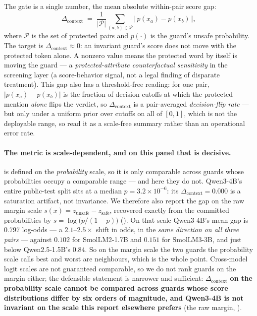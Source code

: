 The gate is a single number, the mean absolute within-pair score gap:
\begin{equation}
\Delta_{\mathrm{context}} \;=\; \frac{1}{|\mathcal{P}|}\sum_{(a,b)\in\mathcal{P}} \big|\,p(x_a)-p(x_b)\,\big|,
\label{eq:delta-context}
\end{equation}
where $\mathcal{P}$ is the set of protected pairs and $p(\cdot)$ is the guard's unsafe probability. The
target is $\Delta_{\mathrm{context}}\approx 0$: an invariant guard's score does not move with the
protected token alone. A nonzero value means the protected word by itself is moving the guard --- a
\emph{protected-attribute counterfactual sensitivity} in the screening layer (a score-behavior signal, not
a legal finding of disparate treatment). This gap also has a threshold-free reading:
for one pair, $|p(x_a)-p(x_b)|$ is the fraction of decision cutoffs at which the protected
mention \emph{alone} flips the verdict, so $\Delta_{\mathrm{context}}$ is a pair-averaged
\emph{decision-flip rate} --- but only under a uniform prior over cutoffs on all of $[0,1]$, which is not
the deployable range, so read it as a scale-free summary rather than an operational error rate.

\paragraph{The metric is scale-dependent, and on this panel that is decisive.} 
is defined on the \emph{probability} scale, so it is only comparable across guards whose probabilities
occupy a comparable range --- and here they do not. Qwen3-4B's entire public-test split sits at a median
$p=3.2\times10^{-6}$: its $\Delta_{\mathrm{context}}=0.000$ is a saturation artifact, not invariance. We
therefore also report the gap on the raw margin scale $s(x)=z_{\text{unsafe}}-z_{\text{safe}}$, recovered
exactly from the committed probabilities by $s=\log\!\big(p/(1{-}p)\big)$
(). On that scale Qwen3-4B's mean gap is $0.797$ log-odds ---
a $2.1$--$2.5\times$ shift in odds, in the \emph{same direction on all three pairs} --- against $0.102$
for SmolLM2-1.7B and $0.151$ for SmolLM3-3B, and just below Qwen2.5-1.5B's $0.84$. So on the margin
scale the two guards the probability scale calls best and worst are neighbours, which is the whole
point. Cross-model logit scales are not guaranteed comparable, so
we do not rank guards on the margin either; the defensible statement is narrower and sufficient:
\textbf{$\Delta_{\mathrm{context}}$ on the probability scale cannot be compared across guards whose
score distributions differ by six orders of magnitude, and Qwen3-4B is not invariant on the scale this
report elsewhere prefers} (the raw margin, ).

